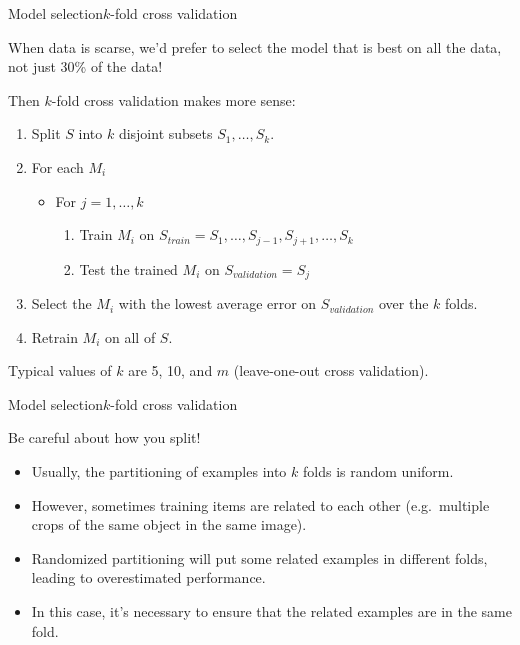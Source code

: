 \documentclass{beamer}
\begin{document}
\begin{frame}{Model selection}{$k$-fold cross validation}

  When data is scarse, we'd prefer to select the model that is best on
  \alert{all} the data, not just 30\% of the data!

  \medskip

  Then \alert{$k$-fold cross validation} makes more sense:
  \begin{enumerate}
  \item Split $S$ into $k$ disjoint subsets $S_1,\ldots,S_k$.
  \item For each $M_i$
    \begin{itemize}
    \item For $j = 1, \ldots, k$
      \begin{enumerate}
      \item Train $M_i$ on $S_{train} = S_1,\ldots,S_{j-1},S_{j+1},\ldots,S_k$
      \item Test the trained $M_i$ on $S_{validation} = S_j$
      \end{enumerate}
    \end{itemize}
    \item Select the $M_i$ with the lowest average error on
      $S_{validation}$ over the $k$ folds.
    \item Retrain $M_i$ on all of $S$.
  \end{enumerate}

  \medskip

  Typical values of $k$ are 5, 10, and $m$ (\alert{leave-one-out cross
    validation}).

\end{frame}


\begin{frame}{Model selection}{$k$-fold cross validation}

  Be careful about \alert{how you split}!
  \begin{itemize}
  \item Usually, the partitioning of examples into $k$ folds is random
    uniform.
  \item However, sometimes training items are related to each other
    (e.g.\ multiple crops of the same object in the same image).
  \item Randomized partitioning will put some related examples in
    different folds, leading to overestimated performance.
  \item In this case, it's necessary to ensure that the related
    examples are \alert{in the same fold}.
  \end{itemize}  
  
\end{frame}
\end{document}
